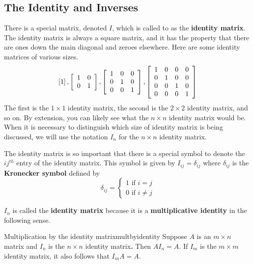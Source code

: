 \subsection{The Identity and Inverses}

There is a special matrix, denoted $I$, which is called
 to as the \textbf{identity matrix}. The identity matrix is always a square
matrix, and it has
the property that there are ones down the main diagonal and zeroes
elsewhere. Here are some identity matrices of various sizes.
\begin{equation*}
\left[ 1\right] ,\left[
\begin{array}{cc}
1 & 0 \\
0 & 1
\end{array}
\right] ,\left[
\begin{array}{ccc}
1 & 0 & 0 \\
0 & 1 & 0 \\
0 & 0 & 1
\end{array}
\right] ,\left[
\begin{array}{cccc}
1 & 0 & 0 & 0 \\
0 & 1 & 0 & 0 \\
0 & 0 & 1 & 0 \\
0 & 0 & 0 & 1
\end{array}
\right] 
\end{equation*}
The first is the $1\times 1$ identity matrix, the second is the $2\times 2$
identity matrix, and so on. By extension, you can likely see
what the $n\times n$ identity matrix would be. When it is necessary to distinguish 
which size of identity matrix is being discussed, we will use the 
notation $I_n$ for the $n \times n$ identity matrix. 

The identity matrix is so important that there
is a special symbol to denote the $ij^{th}$ entry of the identity matrix. This symbol is given by 
$I_{ij}=\delta _{ij}$ where $\delta _{ij}$ is the \textbf{Kronecker symbol}
defined
 by
\begin{equation*}
\delta _{ij}=\left\{
\begin{array}{c}
1
\text{ if }i=j \\
0\text{ if }i\neq j
\end{array}
\right.
\end{equation*}

$I_n$ is called the \textbf{identity matrix} because it is a \textbf{multiplicative identity} in the following sense.

\begin{lemma}{Multiplication by the identity matrix}{multbyidentity}
Suppose $A$ is an $m\times n$ matrix and $I_{n}$ is the $n\times n$ identity
matrix\textbf{.} Then $AI_{n}=A.$ If $I_{m}$ is the $m\times m$ identity
matrix, it also follows that $I_{m}A=A.$
\end{lemma}

